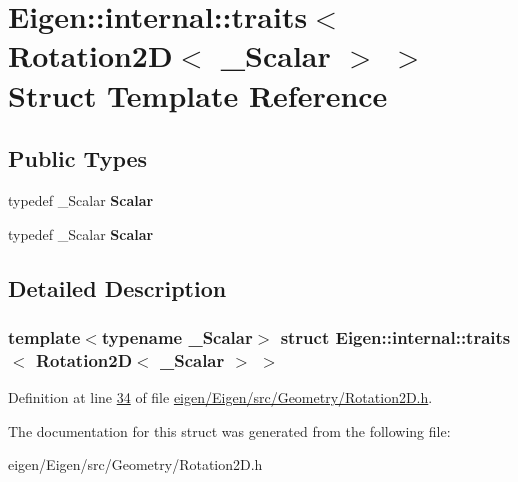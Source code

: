 \hypertarget{struct_eigen_1_1internal_1_1traits_3_01_rotation2_d_3_01___scalar_01_4_01_4}{}\section{Eigen\+:\+:internal\+:\+:traits$<$ Rotation2D$<$ \+\_\+\+Scalar $>$ $>$ Struct Template Reference}
\label{struct_eigen_1_1internal_1_1traits_3_01_rotation2_d_3_01___scalar_01_4_01_4}
\subsection*{Public Types}
\begin{DoxyCompactItemize}
\item 
\mbox{\label{struct_eigen_1_1internal_1_1traits_3_01_rotation2_d_3_01___scalar_01_4_01_4_af8b1ac65b4bce2a1152f5c0d2d0e981b}} 
typedef \+\_\+\+Scalar {\bfseries Scalar}
\item 
\mbox{\label{struct_eigen_1_1internal_1_1traits_3_01_rotation2_d_3_01___scalar_01_4_01_4_af8b1ac65b4bce2a1152f5c0d2d0e981b}} 
typedef \+\_\+\+Scalar {\bfseries Scalar}
\end{DoxyCompactItemize}


\subsection{Detailed Description}
\subsubsection*{template$<$typename \+\_\+\+Scalar$>$\newline
struct Eigen\+::internal\+::traits$<$ Rotation2\+D$<$ \+\_\+\+Scalar $>$ $>$}



Definition at line \hyperlink{eigen_2_eigen_2src_2_geometry_2_rotation2_d_8h_source_l00034}{34} of file \hyperlink{eigen_2_eigen_2src_2_geometry_2_rotation2_d_8h_source}{eigen/\+Eigen/src/\+Geometry/\+Rotation2\+D.\+h}.



The documentation for this struct was generated from the following file\+:\begin{DoxyCompactItemize}
\item 
eigen/\+Eigen/src/\+Geometry/\+Rotation2\+D.\+h\end{DoxyCompactItemize}

